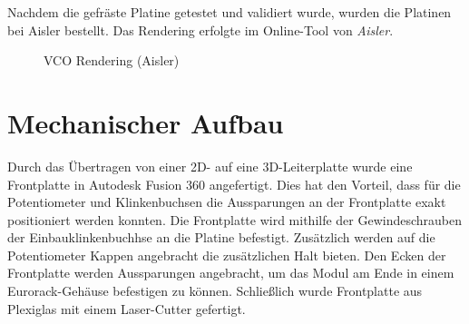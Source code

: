 
\newpage
Nachdem die gefräste Platine getestet und validiert wurde, wurden die Platinen bei Aisler bestellt. 
Das Rendering erfolgte im Online-Tool von \textit{Aisler}.

\begin{figure}[h]
	\centering
	\setlength{\fboxsep}{1pt} %
	\setlength{\fboxrule}{1pt} %
	\caption{VCO Rendering (Aisler)}
	\label{fig:VCO Rendering}
\end{figure}


\newpage

\section{Mechanischer Aufbau}
Durch das Übertragen von einer 2D- auf eine 3D-Leiterplatte wurde eine Frontplatte in Autodesk Fusion 360 angefertigt.
Dies hat den Vorteil, dass für die Potentiometer und Klinkenbuchsen die Aussparungen an der Frontplatte exakt positioniert werden konnten.
Die Frontplatte wird mithilfe der Gewindeschrauben der Einbauklinkenbuchhse an die Platine befestigt.
Zusätzlich werden auf die Potentiometer Kappen angebracht die zusätzlichen Halt bieten.
Den Ecken der Frontplatte werden Aussparungen angebracht, um das Modul am Ende in einem Eurorack-Gehäuse befestigen zu können.
Schließlich wurde Frontplatte aus Plexiglas mit einem Laser-Cutter gefertigt.

